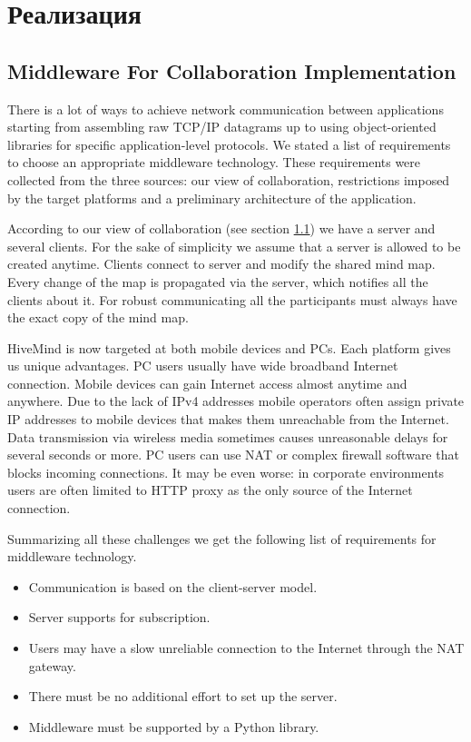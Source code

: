 \newpage
\chapter{Реализация}\label{ch:chapter_2}

\section{Middleware For Collaboration Implementation}

There is a lot of ways to achieve network communication between applications
starting from assembling raw TCP/IP datagrams up to using object-oriented
libraries for specific application-level protocols. We stated a list of
requirements to choose an appropriate middleware technology. These requirements
were collected from the three sources: our view of collaboration, restrictions
imposed by the target platforms and a preliminary architecture of the
application.

According to our view of collaboration (see section \ref{})
we have a server and several clients. For the sake of simplicity we assume that a server is allowed to be created anytime. Clients connect to server and modify
the shared mind map. Every change of the map is propagated via the server, which
notifies all the clients about it. For robust communicating all the participants
must always have the exact copy of the mind map.

HiveMind is now targeted at both mobile devices and PCs. Each platform gives us
unique advantages. PC users usually have wide broadband Internet
connection. Mobile devices can gain Internet access almost anytime and
anywhere. Due to the lack of IPv4 addresses mobile operators often assign
private IP addresses to mobile devices that makes them unreachable from the
Internet. Data transmission via wireless media sometimes causes unreasonable
delays for several seconds or more. PC users can use NAT or complex firewall
software that blocks incoming connections. It may be even worse: in corporate
environments users are often limited to HTTP proxy as the only source of the
Internet connection.

Summarizing all these challenges we get the following list of requirements for
middleware technology.
\begin{itemize}
\item Communication is based on the client-server model.
\item Server supports for subscription.
\item Users may have a slow unreliable connection to the Internet through the
  NAT gateway.
\item There must be no additional effort to set up the server.
\item Middleware must be supported by a Python library.
\end{itemize}

